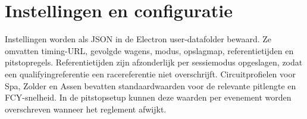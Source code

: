
\section{Instellingen en configuratie}
Instellingen worden als JSON in de Electron user-datafolder bewaard. Ze omvatten timing-URL,
gevolgde wagens, modus, opslagmap, referentietijden en pitstopregels. Referentietijden zijn
afzonderlijk per sessiemodus opgeslagen, zodat een qualifyingreferentie een racereferentie niet
overschrijft. Circuitprofielen voor Spa, Zolder en Assen bevatten standaardwaarden voor de relevante
pitlengte en FCY-snelheid. In de pitstopsetup kunnen deze waarden per evenement worden overschreven
wanneer het reglement afwijkt.
